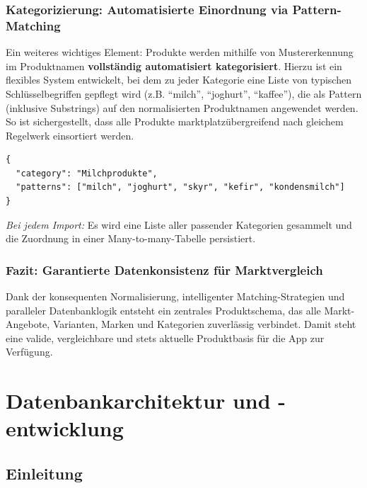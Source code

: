 \documentclass[12pt, a4paper]{report} %
\newcommand{\authorinitials}{} %
\begin{document}
\subsection{Kategorizierung: Automatisierte Einordnung via Pattern-Matching}

Ein weiteres wichtiges Element: Produkte werden mithilfe von Mustererkennung im Produktnamen \textbf{vollständig automatisiert kategorisiert}. Hierzu ist ein flexibles System entwickelt, bei dem zu jeder Kategorie eine Liste von typischen Schlüsselbegriffen gepflegt wird (z.B. "`milch"', "`joghurt"', "`kaffee"'), die als Pattern (inklusive Substrings) auf den normalisierten Produktnamen angewendet werden. So ist sichergestellt, dass alle Produkte marktplatzübergreifend nach gleichem Regelwerk einsortiert werden.

\begin{lstlisting}[style=typescriptstyle, caption={Beispielstruktur: Kategorie-Definitionen als JSON}]
{
  "category": "Milchprodukte",
  "patterns": ["milch", "joghurt", "skyr", "kefir", "kondensmilch"]
}
\end{lstlisting}

\emph{Bei jedem Import:} Es wird eine Liste aller passender Kategorien gesammelt und die Zuordnung in einer Many-to-many-Tabelle persistiert.

\subsection{Fazit: Garantierte Datenkonsistenz für Marktvergleich}

Dank der konsequenten Normalisierung, intelligenter Matching-Strategien und paralleler Datenbanklogik entsteht ein zentrales Produktschema, das alle Markt-Angebote, Varianten, Marken und Kategorien zuverlässig verbindet. Damit steht eine valide, vergleichbare und stets aktuelle Produktbasis für die App zur Verfügung.

\cleardoublepage

\chapter{Datenbankarchitektur und -entwicklung}
\renewcommand{\authorinitials}{DH}

\section{Einleitung}
\end{document}
